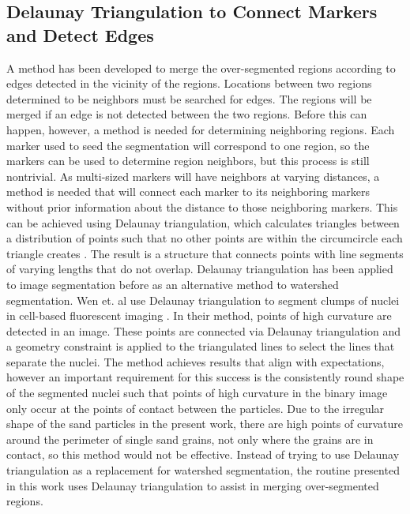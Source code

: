 \subsection{Delaunay Triangulation to Connect Markers and Detect Edges}
A method has been developed to merge the over-segmented regions according
to edges detected in the vicinity of the regions.
Locations
between two regions determined to be neighbors must be searched for edges.
The regions will be merged if an edge is not detected between the two
regions. Before this can happen, however, a method is needed for
determining neighboring regions.
Each marker used to seed the segmentation will correspond
to one region, so the markers can be used to determine region neighbors,
but this process is still nontrivial.
As multi-sized markers will have neighbors at varying
distances, a method is needed that will connect each marker to its
neighboring markers without prior information about the distance to
those neighboring markers.
This can be achieved using Delaunay triangulation,
which calculates triangles between a distribution of points such that no
other points are within the circumcircle each triangle creates
\cite{Voronoi1908,Delaunay1934,Aurenhammer1991}.
The result is a structure that connects points with line segments of
varying lengths that do not overlap. Delaunay triangulation has been
applied to image segmentation before as an alternative method to watershed
segmentation. Wen et. al use Delaunay triangulation to segment clumps of
nuclei in cell-based fluorescent imaging \cite{Wen2009}.
In their method, points of
high curvature are detected in an image. These points are connected via
Delaunay triangulation and a geometry constraint is applied to the
triangulated lines to select the lines that separate the nuclei.
The method achieves results that align with expectations, however an
important requirement for this success is the consistently round shape
of the segmented nuclei such that
points of high curvature in the binary
image only occur at the points of contact between the particles.
Due to the irregular shape of the sand particles in the present work,
there are high points of curvature around the perimeter of single sand
grains, not only where the grains are in contact,
so this method would not be effective.
Instead of trying to use Delaunay
triangulation as a replacement for watershed segmentation, the routine
presented in this work uses Delaunay triangulation to
assist in merging over-segmented regions.

